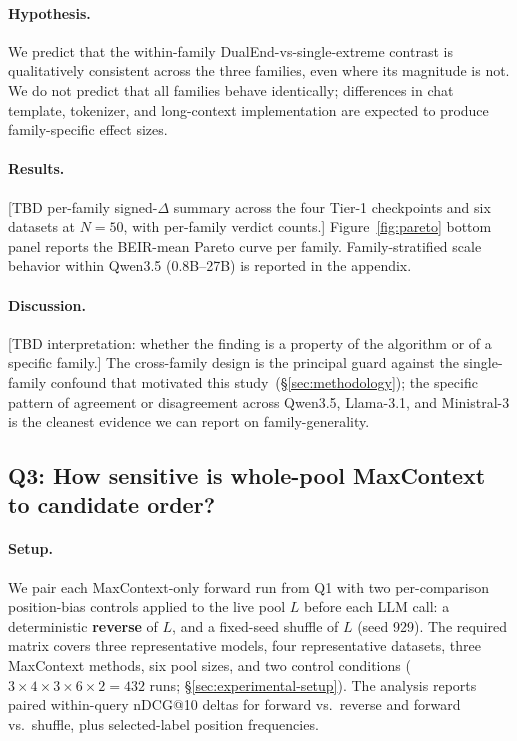 \paragraph{Hypothesis.}
We predict that the within-family DualEnd-vs-single-extreme contrast is qualitatively consistent across the three families, even where its magnitude is not. We do not predict that all families behave identically; differences in chat template, tokenizer, and long-context implementation are expected to produce family-specific effect sizes.

\paragraph{Results.}
[TBD per-family signed-$\Delta$ summary across the four Tier-1 checkpoints and six datasets at $N{=}50$, with per-family verdict counts.] Figure~\ref{fig:pareto} bottom panel reports the BEIR-mean Pareto curve per family. Family-stratified scale behavior within Qwen3.5 (0.8B--27B) is reported in the appendix.

\paragraph{Discussion.}
[TBD interpretation: whether the finding is a property of the algorithm or of a specific family.] The cross-family design is the principal guard against the single-family confound that motivated this study~(\S\ref{sec:methodology}); the specific pattern of agreement or disagreement across Qwen3.5, Llama-3.1, and Ministral-3 is the cleanest evidence we can report on family-generality.

\subsection{Q3: How sensitive is whole-pool MaxContext to candidate order?}
\label{sec:results-position-bias}

\paragraph{Setup.}
We pair each MaxContext-only forward run from Q1 with two per-comparison position-bias controls applied to the live pool $L$ before each LLM call: a deterministic \textbf{reverse} of $L$, and a fixed-seed shuffle of $L$ (seed 929). The required matrix covers three representative models, four representative datasets, three MaxContext methods, six pool sizes, and two control conditions ($3 \times 4 \times 3 \times 6 \times 2 = 432$ runs; \S\ref{sec:experimental-setup}). The analysis reports paired within-query nDCG@10 deltas for forward vs.\ reverse and forward vs.\ shuffle, plus selected-label position frequencies.

